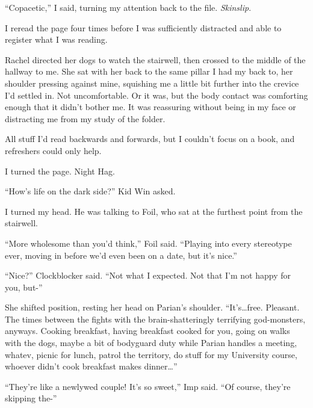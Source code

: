 ``Copacetic,'' I said, turning my attention back to the file.  \emph{Skinslip}.



I reread the page four times before I was sufficiently distracted and able to register what I was reading.



Rachel directed her dogs to watch the stairwell, then crossed to the middle of the hallway to me.  She sat with her back to the same pillar I had my back to, her shoulder pressing against mine, squishing me a little bit further into the crevice I'd settled in.  Not uncomfortable.  Or it was, but the body contact was comforting enough that it didn't bother me.  It was reassuring without being in my face or distracting me from my study of the folder.



All stuff I'd read backwards and forwards, but I couldn't focus on a book, and refreshers could only help.



I turned the page.  Night Hag.



``How's life on the dark side?'' Kid Win asked.



I turned my head.  He was talking to Foil, who sat at the furthest point from the stairwell.



``More wholesome than you'd think,'' Foil said.  ``Playing into every stereotype ever, moving in before we'd even been on a date, but it's nice.''



``Nice?'' Clockblocker said.  ``Not what I expected.  Not that I'm not happy for you, but-''



She shifted position, resting her head on Parian's shoulder.  ``It's\ldots free.  Pleasant.  The times between the fights with the brain-shatteringly terrifying god-monsters, anyways.  Cooking breakfast, having breakfast cooked for you, going on walks with the dogs, maybe a bit of bodyguard duty while Parian handles a meeting, whatev, picnic for lunch, patrol the territory, do stuff for my University course, whoever didn't cook breakfast makes dinner\ldots''



``They're like a newlywed couple!  It's so sweet,'' Imp said.  ``Of course, they're skipping the-''



